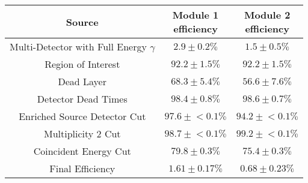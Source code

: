 \begin{tabular}{|c|c|c|}
\hline
  Source & \makecell{Module 1\\efficiency} & \makecell{Module 2\\efficiency} \\
\hline
  \makecell{Multi-Detector with\\Full Energy $\gamma$} & $2.9 \pm 0.2\%$ & $1.5 \pm 0.5\%$ \\
  Region of Interest & $92.2 \pm 1.5\%$ & $92.2 \pm 1.5\%$ \\
  Dead Layer & $68.3 \pm 5.4\%$ & $56.6 \pm 7.6\%$ \\
  Detector Dead Times & $98.4 \pm 0.8\%$ & $98.6 \pm 0.7\%$ \\
  Enriched Source Detector Cut & $97.6 \pm{}<\!0.1\%$ & $94.2 \pm{}<\!0.1\%$ \\
  Multiplicity 2 Cut & $98.7 \pm{}<\!0.1\%$ & $99.2 \pm{}<\!0.1\%$ \\
  Coincident Energy Cut & $79.8 \pm 0.3\%$ & $75.4 \pm 0.3\%$ \\
  \hline Final Efficiency & $1.61 \pm 0.17\%$ & $0.68 \pm 0.23\%$ \\
\hline
\end{tabular}
